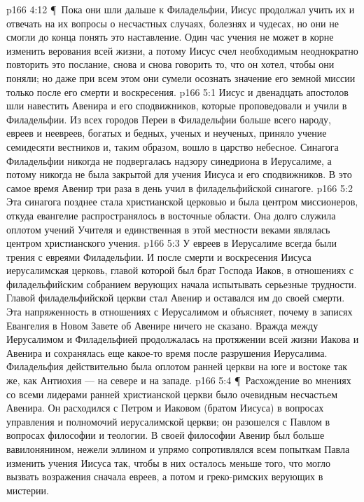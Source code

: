 \vs p166 4:12 \P\ Пока они шли дальше к Филадельфии, Иисус продолжал учить их и отвечать на их вопросы о несчастных случаях, болезнях и чудесах, но они не смогли до конца понять это наставление. Один час учения не может в корне изменить верования всей жизни, а потому Иисус счел необходимым неоднократно повторить это послание, снова и снова говорить то, что он хотел, чтобы они поняли; но даже при всем этом они сумели осознать значение его земной миссии только после его смерти и воскресения.
\vs p166 5:1 Иисус и двенадцать апостолов шли навестить Авенира и его сподвижников, которые проповедовали и учили в Филадельфии. Из всех городов Переи в Филадельфии больше всего народу, евреев и неевреев, богатых и бедных, ученых и неученых, приняло учение семидесяти вестников и, таким образом, вошло в царство небесное. Синагога Филадельфии никогда не подвергалась надзору синедриона в Иерусалиме, а потому никогда не была закрытой для учения Иисуса и его сподвижников. В это самое время Авенир три раза в день учил в филадельфийской синагоге.
\vs p166 5:2 Эта синагога позднее стала христианской церковью и была центром миссионеров, откуда евангелие распространялось в восточные области. Она долго служила оплотом учений Учителя и единственная в этой местности веками являлась центром христианского учения.
\vs p166 5:3 У евреев в Иерусалиме всегда были трения с евреями Филадельфии. И после смерти и воскресения Иисуса иерусалимская церковь, главой которой был брат Господа Иаков, в отношениях с филадельфийским собранием верующих начала испытывать серьезные трудности. Главой филадельфийской церкви стал Авенир и оставался им до своей смерти. Эта напряженность в отношениях с Иерусалимом и объясняет, почему в записях Евангелия в Новом Завете об Авенире ничего не сказано. Вражда между Иерусалимом и Филадельфией продолжалась на протяжении всей жизни Иакова и Авенира и сохранялась еще какое\hyp{}то время после разрушения Иерусалима. Филадельфия действительно была оплотом ранней церкви на юге и востоке так же, как Антиохия --- на севере и на западе.
\vs p166 5:4 \P\ Расхождение во мнениях со всеми лидерами ранней христианской церкви было очевидным несчастьем Авенира. Он расходился с Петром и Иаковом (братом Иисуса) в вопросах управления и полномочий иерусалимской церкви; он разошелся с Павлом в вопросах философии и теологии. В своей философии Авенир был больше вавилонянином, нежели эллином и упрямо сопротивлялся всем попыткам Павла изменить учения Иисуса так, чтобы в них осталось меньше того, что могло вызвать возражения сначала евреев, а потом и греко\hyp{}римских верующих в мистерии.
